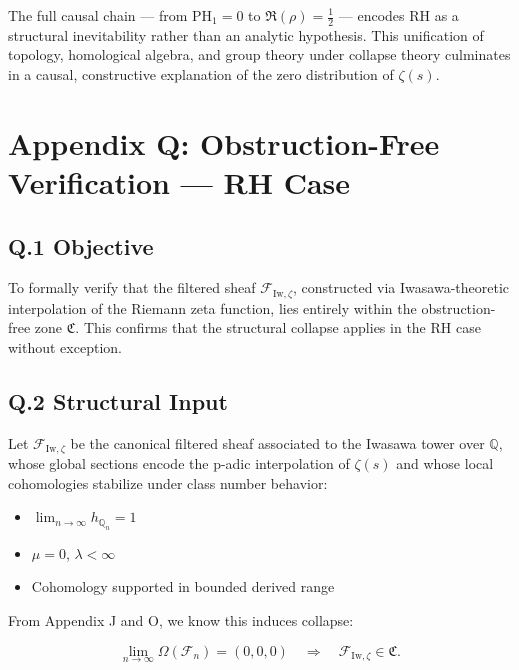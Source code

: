 \documentclass[11pt]{article}
\begin{document}
The full causal chain — from \( \mathrm{PH}_1 = 0 \) to \( \Re(\rho) = \tfrac{1}{2} \) — encodes RH as a structural inevitability rather than an analytic hypothesis. This unification of topology, homological algebra, and group theory under collapse theory culminates in a causal, constructive explanation of the zero distribution of \( \zeta(s) \).



\appendix
\section*{Appendix Q: Obstruction-Free Verification — RH Case}

\subsection*{Q.1 Objective}

To formally verify that the filtered sheaf \( \mathcal{F}_{\mathrm{Iw},\zeta} \), constructed via Iwasawa-theoretic interpolation of the Riemann zeta function, lies entirely within the obstruction-free zone \( \mathfrak{C} \). This confirms that the structural collapse applies in the RH case without exception.

\subsection*{Q.2 Structural Input}

Let \( \mathcal{F}_{\mathrm{Iw},\zeta} \) be the canonical filtered sheaf associated to the Iwasawa tower over \( \mathbb{Q} \), whose global sections encode the p-adic interpolation of \( \zeta(s) \) and whose local cohomologies stabilize under class number behavior:

\begin{itemize}
  \item \( \lim_{n \to \infty} h_{\mathbb{Q}_n} = 1 \)
  \item \( \mu = 0 \), \( \lambda < \infty \)
  \item Cohomology supported in bounded derived range
\end{itemize}

From Appendix J and O, we know this induces collapse:

\[
\lim_{n \to \infty} \Omega(\mathcal{F}_n) = (0,0,0) \quad \Rightarrow \quad \mathcal{F}_{\mathrm{Iw},\zeta} \in \mathfrak{C}.
\]
\end{document}
